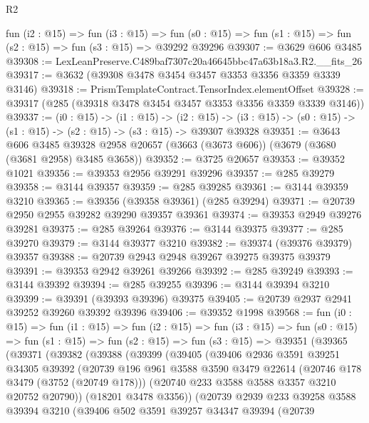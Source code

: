 \begin{lexlean}{R2}
\begin{coremodule}
  fun (i2 : @15) =>
  fun (i3 : @15) =>
  fun (s0 : @15) => fun (s1 : @15) => fun (s2 : @15) => fun (s3 : @15) => @39292 @39296
@39307 := @3629 @606 @3485
@39308 := LexLeanPreserve.C489baf7307c20a46645bbc47a63b18a3.R2.__fits_26
@39317 := @3632 (@39308 @3478 @3454 @3457 @3353 @3356 @3359 @3339 @3146)
@39318 := PrismTemplateContract.TensorIndex.elementOffset
@39328 := @39317 (@285 (@39318 @3478 @3454 @3457 @3353 @3356 @3359 @3339 @3146))
@39337 := (i0 : @15) ->
  (i1 : @15) ->
  (i2 : @15) -> (i3 : @15) -> (s0 : @15) -> (s1 : @15) -> (s2 : @15) -> (s3 : @15) -> @39307 @39328
@39351 := @3643
    @606
    @3485
    @39328
    @2958
    @20657
    (@3663 (@3673 @606))
    (@3679 (@3680 (@3681 @2958) @3485 @3658))
@39352 := @3725 @20657
@39353 := @39352 @1021
@39356 := @39353 @2956 @39291 @39296
@39357 := @285 @39279
@39358 := @3144 @39357
@39359 := @285 @39285
@39361 := @3144 @39359 @3210
@39365 := @39356 (@39358 @39361) (@285 @39294)
@39371 := @20739 @2950 @2955 @39282 @39290 @39357 @39361
@39374 := @39353 @2949 @39276 @39281
@39375 := @285 @39264
@39376 := @3144 @39375
@39377 := @285 @39270
@39379 := @3144 @39377 @3210
@39382 := @39374 (@39376 @39379) @39357
@39388 := @20739 @2943 @2948 @39267 @39275 @39375 @39379
@39391 := @39353 @2942 @39261 @39266
@39392 := @285 @39249
@39393 := @3144 @39392
@39394 := @285 @39255
@39396 := @3144 @39394 @3210
@39399 := @39391 (@39393 @39396) @39375
@39405 := @20739 @2937 @2941 @39252 @39260 @39392 @39396
@39406 := @39352 @1998
@39568 := fun (i0 : @15) =>
  fun (i1 : @15) =>
  fun (i2 : @15) =>
  fun (i3 : @15) =>
  fun (s0 : @15) =>
  fun (s1 : @15) =>
  fun (s2 : @15) =>
  fun (s3 : @15) =>
  @39351
    (@39365
      (@39371
        (@39382
          (@39388
            (@39399
              (@39405
                (@39406
                  @2936
                  @3591
                  @39251
                  @34305
                  @39392
                  (@20739
                    @196
                    @961
                    @3588
                    @3590
                    @3479
                    @22614
                    (@20746 @178 @3479 (@3752 (@20749 @178)))
                    (@20740 @233 @3588 @3588 @3357 @3210 @20752 @20790))
                  (@18201 @3478 @3356))
                (@20739
                  @2939
                  @233
                  @39258
                  @3588
                  @39394
                  @3210
                  (@39406
                    @502
                    @3591
                    @39257
                    @34347
                    @39394
                    (@20739

\end{coremodule}
\end{lexlean}
